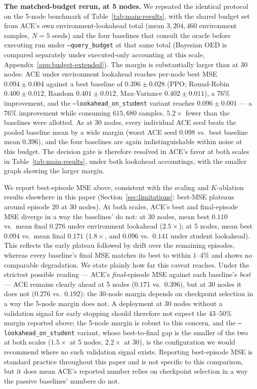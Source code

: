 \documentclass{article}
\theoremstyle{plain}
\theoremstyle{definition}
\theoremstyle{remark}
\begin{document}
\textbf{The matched-budget rerun, at 5 nodes.} We repeated the identical protocol on the 5-node benchmark of Table~\ref{tab:main-results}, with the shared budget set from ACE's own environment-lookahead total (mean $3{,}204{,}460$ environment samples, $N{=}5$ seeds) and the four baselines that consult the oracle before executing run under \texttt{--query\_budget} at that same total (Bayesian OED is compared separately under executed-only accounting at this scale, Appendix~\ref{app:budget-extended}). The margin is substantially larger than at 30 nodes: ACE under environment lookahead reaches per-node best MSE $0.094\pm0.004$ against a best baseline of $0.396\pm0.028$ (PPO; Round-Robin $0.400\pm0.012$, Random $0.401\pm0.012$, Max-Variance $0.402\pm0.011$), a $76\%$ improvement, and the \texttt{--lookahead\_on\_student} variant reaches $0.096\pm0.001$ --- a $76\%$ improvement while consuming $615{,}680$ samples, $5.2\times$ fewer than the baselines were allotted. As at 30 nodes, every individual ACE seed beats the pooled baseline mean by a wide margin (worst ACE seed $0.098$ vs.\ best baseline mean $0.396$), and the four baselines are again indistinguishable within noise at this budget. The decision gate is therefore resolved in ACE's favor at both scales in Table~\ref{tab:main-results}, under both lookahead accountings, with the smaller graph showing the larger margin.

We report best-episode MSE above, consistent with the scaling and $K$-ablation results elsewhere in this paper (Section~\ref{sec:limitations}: best-MSE plateaus around episode 20 at 30 nodes). At both scales, ACE's best and final-episode MSE diverge in a way the baselines' do not: at 30 nodes, mean best $0.110$ vs.\ mean final $0.276$ under environment lookahead ($2.5\times$); at 5 nodes, mean best $0.094$ vs.\ mean final $0.171$ ($1.8\times$, and $0.096$ vs.\ $0.141$ under student lookahead). This reflects the early plateau followed by drift over the remaining episodes, whereas every baseline's final MSE matches its best to within $1$--$4\%$ and shows no comparable degradation. We state plainly how far this caveat reaches. Under the strictest possible reading --- ACE's \emph{final}-episode MSE against each baseline's \emph{best} --- ACE remains clearly ahead at 5 nodes ($0.171$ vs.\ $0.396$), but at 30 nodes it does not ($0.276$ vs.\ $0.192$): the 30-node margin depends on checkpoint selection in a way the 5-node margin does not. A deployment at 30 nodes without a validation signal for early stopping should therefore not expect the $43$--$50\%$ margin reported above; the 5-node margin is robust to this concern, and the \texttt{--lookahead\_on\_student} variant, whose best-to-final gap is the smaller of the two at both scales ($1.5\times$ at 5 nodes, $2.2\times$ at 30), is the configuration we would recommend where no such validation signal exists. Reporting best-episode MSE is standard practice throughout this paper and is not specific to this comparison, but it does mean ACE's reported number relies on checkpoint selection in a way the passive baselines' numbers do not.
\end{document}
